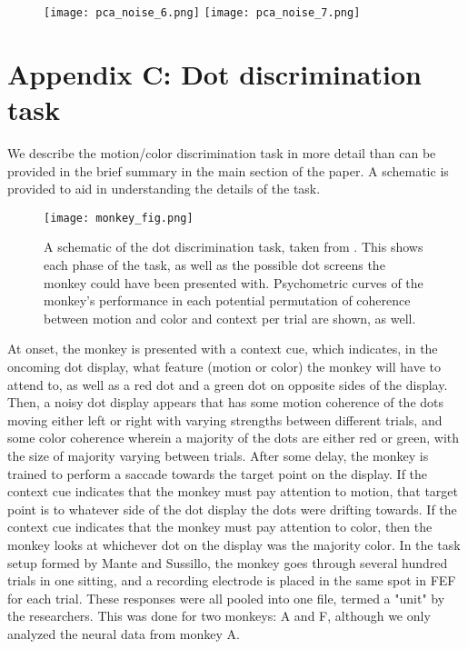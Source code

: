 \documentclass[12pt,a4paper,final]{iopart}
\begin{document}
\begin{figure}
    \centering
    \texttt{[image: pca\_noise\_6.png]}
    \texttt{[image: pca\_noise\_7.png]}
    \label{fig:my_label}
\end{figure}

\newpage

\section*{Appendix C: Dot discrimination task}
We describe the motion/color discrimination task in more detail than can be provided in the brief summary in the main section of the paper. A schematic is provided to aid in understanding the details of the task.

\begin{figure}[h!]
  \centering
  \texttt{[image: monkey\_fig.png]}
  \caption{A schematic of the dot discrimination task, taken from \cite{Mante2013}. This shows each phase of the task, as well as the possible dot screens the monkey could have been presented with. Psychometric curves of the monkey's performance in each potential permutation of coherence between motion and color and context per trial are shown, as well.}
\end{figure}

At onset, the monkey is presented with a context cue, which indicates, in the oncoming dot display, what feature (motion or color) the monkey will have to attend to, as well as a red dot and a green dot on opposite sides of the display. Then, a noisy dot display appears that has some motion coherence of the dots moving either left or right with varying strengths between different trials, and some color coherence wherein a majority of the dots are either red or green, with the size of majority varying between trials. After some delay, the monkey is trained to perform a saccade towards the target point on the display. If the context cue indicates that the monkey must pay attention to motion, that target point is to whatever side of the dot display the dots were drifting towards. If the context cue indicates that the monkey must pay attention to color, then the monkey looks at whichever dot on the display was the majority color. In the task setup formed by Mante and Sussillo, the monkey goes through several hundred trials in one sitting, and a recording electrode is placed in the same spot in FEF for each trial. These responses were all pooled into one file, termed a "unit" by the researchers. This was done for two monkeys: A and F, although we only analyzed the neural data from monkey A.
\end{document}
